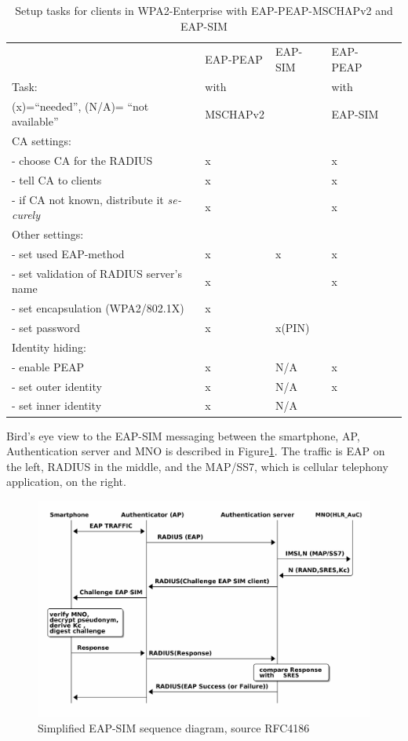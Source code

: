 \documentclass[12pt,a4paper,english]{tutthesis}
\begin{document}
\begin{otherlanguage}{english}
\begin{table}[htb]
\caption{\label{table-peapsim}Setup tasks for clients in WPA2-Enterprise with EAP-PEAP-MSCHAPv2 and EAP-SIM}
\centering
\begin{tabular}{|l|l|l|ll|}
\hline
 & EAP-PEAP & EAP-SIM & EAP-PEAP & \\
Task: & with &  & with & \\
(x)=``needed'', (N/A)= ``not available'' & MSCHAPv2 &  & EAP-SIM & \\
\hline
CA settings: &  &  &  & \\
- choose CA for the RADIUS & x &  & x & \\
- tell CA to clients & x &  & x & \\
- if CA not known, distribute it \emph{securely} & x &  & x & \\
\hline
Other settings: &  &  &  & \\
- set used EAP-method & x & x & x & \\
- set validation of RADIUS server's name & x &  & x & \\
- set encapsulation (WPA2/802.1X) & x &  &  & \\
- set password & x & x(PIN) &  & \\
\hline
Identity hiding: &  &  &  & \\
- enable PEAP & x & N/A & x & \\
- set outer identity & x & N/A & x & \\
- set inner identity & x & N/A &  & \\
\hline
\end{tabular}
\end{table}


Bird's eye view to the EAP-SIM messaging between the smartphone, AP,
Authentication server and MNO is described in Figure\ref{fig:eap-sim-simple}.
The traffic is EAP on the left, RADIUS  in
the middle, and the MAP/SS7, which is cellular telephony
application, on the right.


\begin{figure}[htb]
\centering
\includegraphics[width=.9\linewidth]{eap-sim-simple.png}
\caption{\label{fig:eap-sim-simple}Simplified EAP-SIM sequence diagram, source RFC4186}
\end{figure}









\end{otherlanguage}
\end{document}
